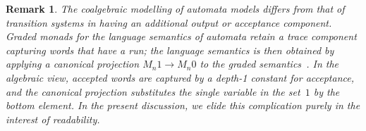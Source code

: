 \documentclass[11pt,a4paper]{amsart}
\newtheorem{remark}[remark]{Remark}
\newcommand{\pow}{\mathcal{P}}
\newcommand{\powf}{\pow_{\omega}}
\theoremstyle{plain}
\numberwithin{equation}{section}
\newcommand{\+}[1]{\mathcal{#1}\xspace}
\theoremstyle{definition}
\newcommand{\Act}{\mathcal{A}}
\begin{document}
\begin{remark}\label{rem:automata}
  The coalgebraic modelling of automata models differs from that of
  transition systems in having an additional output or acceptance
  component. %
  Graded monads for the language semantics of automata retain a trace
  component capturing words that have a run; the language semantics is
  then obtained by applying a canonical projection $M_n1\to M_n0$ to
  the graded semantics~\cite{KurzEA15,MiliusEA15}. In the algebraic
  view, accepted words are captured by a depth-1 constant for
  acceptance, and the canonical projection substitutes the single
  variable in the set~$1$ by the bottom
  element. %
  In the present discussion, we elide this complication purely in the
  interest of readability.
\end{remark}
\end{document}
